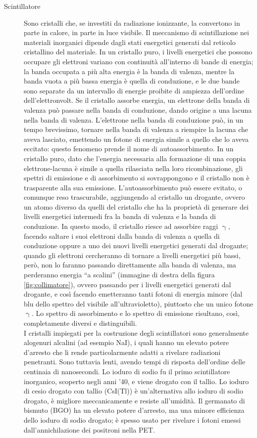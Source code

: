 \documentclass{report}
\newcommand{\virgolette}[1]{``#1''}
\newcommand{\figref}[1]{figura \ref{#1}}
\numberwithin{equation}{section}
\numberwithin{figure}{section}
\begin{document}
\begin{description}
    \item[Scintillatore] Sono cristalli che, se investiti da radiazione ionizzante, la convertono in parte in calore, in parte in luce visibile. Il meccanismo di scintillazione nei materiali inorganici dipende dagli stati energetici generati dal reticolo cristallino del materiale. In un cristallo puro, i livelli energetici che possono occupare gli elettroni variano con continuità all'interno di bande di energia; la banda occupata a più alta energia è la banda di valenza, mentre la banda vuota a più bassa energia è quella di conduzione, e le due bande sono separate da un intervallo di energie proibite di ampiezza dell'ordine dell'elettronvolt. Se il cristallo assorbe energia, un elettrone della banda di valenza può passare nella banda di conduzione, dando origine a una lacuna nella banda di valenza. L'elettrone nella banda di conduzione può, in un tempo brevissimo, tornare nella banda di valenza a riempire la lacuna che aveva lasciato, emettendo un fotone di energia simile a quello che lo aveva eccitato: questo fenomeno prende il nome di autoassorbimento. In un cristallo puro, dato che l’energia necessaria alla formazione di una coppia elettrone-lacuna è simile a quella rilasciata nella loro ricombinazione, gli spettri di emissione e di assorbimento si sovrappongono e il cristallo non è trasparente alla sua emissione. L'autoassorbimento può essere evitato, o comunque reso trascurabile, aggiungendo al cristallo un drogante, ovvero un atomo diverso da quelli del cristallo che ha la proprietà di generare dei livelli energetici intermedi fra la banda di valenza e la banda di conduzione. In questo modo, il cristallo riesce ad assorbire raggi $\upgamma$, facendo saltare i suoi elettroni dalla banda di valenza a quella di conduzione oppure a uno dei nuovi livelli energetici generati dal drogante; quando gli elettroni cercheranno di tornare a livelli energetici più bassi, però, non lo faranno passando direttamente alla banda di valenza, ma perderanno energia \virgolette{a scalini} (immagine di destra della \figref{fig:collimatore}), ovvero passando per i livelli energetici generati dal drogante, e così facendo emetteranno tanti fotoni di energia minore (dal blu dello spettro del visibile all'ultravioletto), piuttosto che un unico fotone $\upgamma$. Lo spettro di assorbimento e lo spettro di emissione risultano, così, completamente diversi e distinguibili.\\
    I cristalli impiegati per la costruzione degli scintillatori sono generalmente alogenuri alcalini (ad esempio NaI), i quali hanno un elevato potere d’arresto che li rende particolarmente adatti a rivelare radiazioni penetranti. Sono tuttavia lenti, avendo tempi di risposta dell'ordine delle centinaia di nanosecondi. Lo ioduro di sodio fu il primo scintillatore inorganico, scoperto negli anni '40, e viene drogato con il tallio. Lo ioduro di cesio drogato con tallio (CsI(Tl)) è un'alternativa allo ioduro di sodio drogato, è migliore meccanicamente e resiste all'umidità. Il germanato di bismuto (BGO) ha un elevato potere d'arresto, ma una minore efficienza dello ioduro di sodio drogato; è spesso usato per rivelare i fotoni emessi dall'annichilazione dei positroni nella PET.


\end{description}
\end{document}

